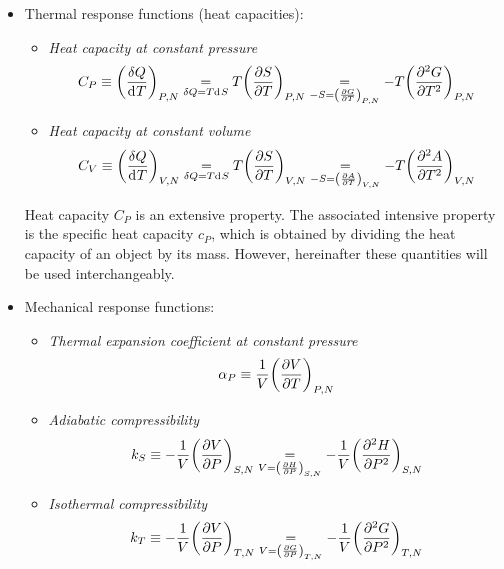 \documentclass[../../Main/Main.tex]{subfiles}
\begin{document}
\begin{itemize}
    \item Thermal response functions (heat capacities):
    \begin{itemize}
        \item \emph{Heat capacity at constant pressure}
            \begin{equation}
            C_P \equiv \qty(\frac{\delta Q}{\dd[]{T} } )_{P,N}
                \underset{\delta Q = T \dd[]{S} }{=} T \qty(\pdv{S}{T} )_{P,N}
                \underset{-S=\qty(\pdv{G}{T} )_{P,N} }{=} - T \qty(\pdv[2]{G}{T} )_{P,N}
            \label{eq:}
            \end{equation}
        \item \emph{Heat capacity at constant volume}
            \begin{equation}
            C_V \equiv \qty(\frac{\delta Q}{\dd[]{T} } )_{V,N}
                \underset{\delta Q = T \dd[]{S} }{=} T \qty(\pdv{S}{T} )_{V,N}
                \underset{-S=\qty(\pdv{A}{T} )_{V,N} }{=} - T \qty(\pdv[2]{A}{T} )_{V,N}
            \label{eq:}
            \end{equation}
    \end{itemize}
    \begin{remark}
    Heat capacity \( C_P \) is an extensive property. The associated intensive property is the specific heat capacity \( c_P \), which is obtained by dividing the heat capacity of an object by its mass. However, hereinafter these quantities will be used interchangeably.
    \end{remark}
\end{itemize}



\begin{itemize}
    \item Mechanical response functions:
    \begin{itemize}
        \item \emph{Thermal expansion coefficient at constant pressure}
            \begin{equation}
             \alpha _P \equiv \frac{1}{V} \qty(\pdv{V}{T} )_{P,N}
            \label{eq:}
            \end{equation}
        \item \emph{Adiabatic compressibility}
            \begin{equation}
            k_S \equiv -\frac{1}{V} \qty(\pdv{V}{P} )_{S,N} \underset{V=\qty(\pdv{H}{P} )_{S,N} }{=} - \frac{1}{V} \qty(\pdv[2]{H}{P} )_{S,N}
            \label{eq:}
            \end{equation}
        \item \emph{Isothermal compressibility}
            \begin{equation}
              k_T \equiv -\frac{1}{V} \qty(\pdv{V}{P} )_{T,N} \underset{V=\qty(\pdv{G}{P} )_{T,N} }{=} - \frac{1}{V} \qty(\pdv[2]{G}{P} )_{T,N}
              \label{eq:}
            \end{equation}
    \end{itemize}
\end{itemize}
\end{document}
